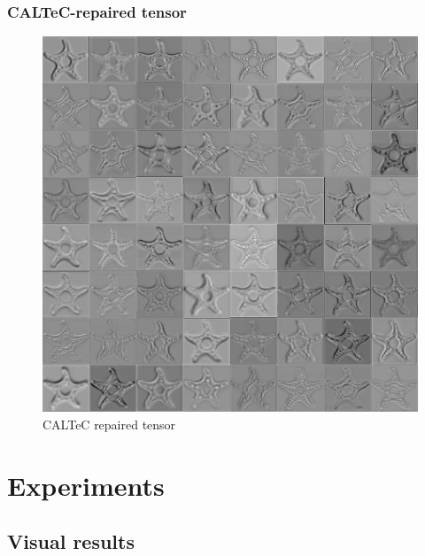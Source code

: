 \documentclass[aspectratio=169]{beamer}
\begin{document}
\begin{frame}
	\frametitle{CALTeC-repaired tensor}
	\begin{figure}[H]
		\centering
		\includegraphics[scale=0.32]{caltecdemotiled.jpg}
		\caption{CALTeC repaired tensor}
	\end{figure}
\end{frame}


\section{Experiments}
\subsection{Visual results}
\end{document}
